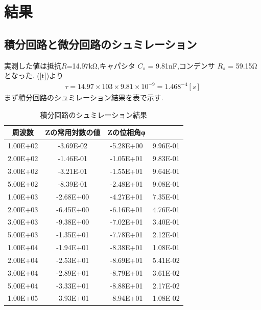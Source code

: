 \documentclass[a4j,10pt,dvipdfmx]{jarticle}
\begin{document}
\section{結果}
\subsection{積分回路と微分回路のシュミレーション}
実測した値は抵抗$R$=14.97kΩ,キャパシタ $C_s$ = 9.81nF,コンデンサ $R_s$ = 59.15Ωとなった.
(\ref{t})より
\begin{eqnarray}
  \label{tji}
  τ=14.97\times 103 \times 9.81 \times 10^{-9}= 1.468^{-4}[s]
\end{eqnarray}
まず積分回路のシュミレーション結果を表で示す.
\begin{table}[H]
  \label{seresult1}
  \begin{center}
    \caption{積分回路のシュミレーション結果}
    \begin{tabular}{cccc}
周波数 & Zの常用対数の値 & Zの位相角φ & 	\textbar{Z}\textbar[Ω] \\ \hline
1.00E+02 & -3.69E-02 & -5.28E+00 & 9.96E-01 \\
2.00E+02 & -1.46E-01 & -1.05E+01 & 9.83E-01 \\
3.00E+02 & -3.21E-01 & -1.55E+01 & 9.64E-01 \\
5.00E+02 & -8.39E-01 & -2.48E+01 & 9.08E-01 \\
1.00E+03 & -2.68E+00 & -4.27E+01 & 7.35E-01 \\
2.00E+03 & -6.45E+00 & -6.16E+01 & 4.76E-01 \\
3.00E+03 & -9.38E+00 & -7.02E+01 & 3.40E-01 \\
5.00E+03 & -1.35E+01 & -7.78E+01 & 2.12E-01 \\
1.00E+04 & -1.94E+01 & -8.38E+01 & 1.08E-01 \\
2.00E+04 & -2.53E+01 & -8.69E+01 & 5.41E-02 \\
3.00E+04 & -2.89E+01 & -8.79E+01 & 3.61E-02 \\
5.00E+04 & -3.33E+01 & -8.88E+01 & 2.17E-02 \\
1.00E+05 & -3.93E+01 & -8.94E+01 & 1.08E-02 \\
\end{tabular}
\end{center}
\end{table}
\end{document}
